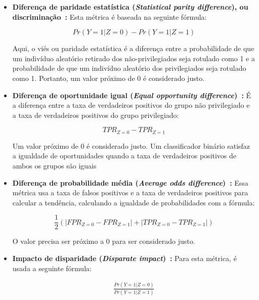 \documentclass[portugues]{ic-tese}
\begin{document}
\begin{itemize}
\item \textbf{Diferença de paridade estatística (\textit{Statistical parity difference}), ou discriminação~\citep{Zemel_2013}:} Esta métrica é baseada na seguinte fórmula:

\begin{equation}
Pr(Y=1|Z=0)-Pr(Y=1|Z=1)
\end{equation}
 
Aqui, o viés ou paridade estatística é a diferença entre a probabilidade de que um indivíduo aleatório retirado dos não-privilegiados seja rotulado como 1 e a probabilidade de que um indivíduo aleatório dos privilegiados seja rotulado como 1. Portanto, um valor próximo de 0 é considerado justo.

\item \textbf{Diferença de oportunidade igual (\textit{Equal opportunity difference})~\citep{Biswas_2020}:} É a diferença entre a taxa de verdadeiros positivos do grupo não privilegiado e a taxa de verdadeiros positivos do grupo privilegiado:

\begin{equation}
TPR_{Z=0} - TPR_{Z=1}
\end{equation}
 
Um valor próximo de 0 é considerado justo. Um classificador binário satisfaz a igualdade de oportunidades quando a taxa de verdadeiros positivos de ambos os grupos são iguais~\citep{Hardt_2016}

\item \textbf{Diferença de probabilidade média (\textit{Average odds difference})~\citep{Biswas_2020}:} Essa métrica usa a taxa de falsos positivos e a taxa de verdadeiros positivos para calcular a tendência, calculando a igualdade de probabilidades com a fórmula:

\begin{equation}
\frac{1}{2}(|FPR_{Z=0} - FPR_{Z=1}|+|TPR_{Z=0} - TPR_{Z=1}|)
\end{equation}
 
O valor precisa ser próximo a 0 para ser considerado justo.

\item \textbf{Impacto de disparidade (\textit{Disparate impact})~\citep{Biswas_2020}:} Para esta métrica, é usada a seguinte fórmula:

\begin{align*}
\frac{Pr(Y=1|Z=0)}{Pr(Y=1|Z=1)}
\end{align*}


\end{itemize}
\end{document}
